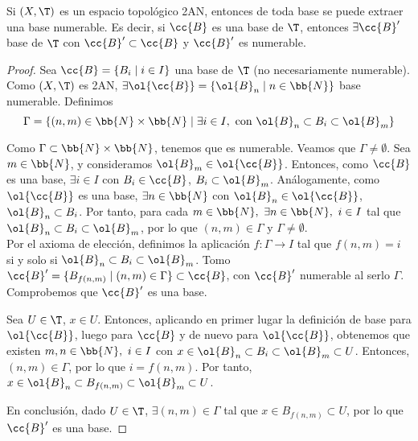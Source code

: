 \begin{prop}
    Si $(X,\T)$ es un espacio topológico 2AN, entonces de toda base se puede extraer una base numerable. Es decir, si $\cc{B}$ es una base de $\T$, entonces $\exists \cc{B}'$ base de $\T$ con $\cc{B}'\subset \cc{B}$ y $\cc{B}'$ es numerable.
\end{prop}
\begin{proof}
    Sea $\cc{B}=\{B_i\mid i\in I\}$ una base de $\T$ (no necesariamente numerable). Como $(X,\T)$ es 2AN, $\exists \ol{\cc{B}}=\{\ol{B}_n\mid n\in \bb{N}\}$ base numerable. Definimos
    $$\Gamma = \{(n,m)\in \bb{N}\times \bb{N}\mid \exists i\in I,\text{ con } \ol{B}_n \subset B_i\subset \ol{B}_m\}$$

    Como $\Gamma \subset \bb{N}\times \bb{N}$, tenemos que es numerable. Veamos que $\Gamma\neq \emptyset$. Sea $m\in \bb{N}$, y consideramos $\ol{B}_m\in \ol{\cc{B}}$. Entonces, como $\cc{B}$ es una base, $\exists i\in I$ con $B_i\in \cc{B}$, $B_i\subset \ol{B}_m$. Análogamente, como $\ol{\cc{B}}$ es una base, $\exists n\in \bb{N}$ con $\ol{B}_n\in \ol{\cc{B}}$, $\ol{B}_n\subset B_i$. Por tanto, para cada $m\in \bb{N},~\exists n\in \bb{N},~i\in I$ tal que $\ol{B}_n \subset B_i\subset \ol{B}_m$, por lo que $(n,m)\in \Gamma$ y $\Gamma\neq \emptyset$.\\
    
    Por el axioma de elección, definimos la aplicación $f:\Gamma\to I$ tal que $f(n,m)=i$ si y solo si $\ol{B}_n\subset B_{i}\subset \ol{B}_m$. Tomo $\cc{B}'=\{B_{f(n,m)}\mid (n,m)\in \Gamma\}\subset \cc{B}$, con $\cc{B}'$ numerable al serlo $\Gamma$. Comprobemos que $\cc{B}'$ es una base.

    Sea $U\in \T$, $x\in U$. Entonces, aplicando en primer lugar la definición de base para $\ol{\cc{B}}$, luego para $\cc{B}$ y de nuevo para $\ol{\cc{B}}$, obtenemos que existen $m,n\in \bb{N},~i\in I$ con $x\in \ol{B}_n\subset B_i\subset \ol{B}_m\subset U$. Entonces, $(n,m)\in \Gamma$, por lo que $i=f(n,m)$. Por tanto, $x\in \ol{B}_n\subset B_{f(n,m)}\subset \ol{B}_m\subset U$.
    
    En conclusión, dado $U\in \T$, $\exists (n,m)\in \Gamma$ tal que $x\in B_{f(n,m)}\subset U$, por lo que $\cc{B}'$ es una base.
\end{proof}

